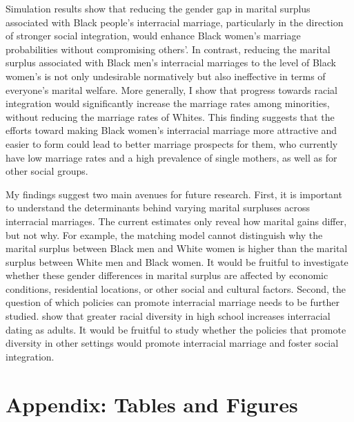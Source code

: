 Simulation results show that reducing the gender gap in marital surplus associated with Black people's interracial marriage, particularly in the direction of stronger social integration, would enhance Black women's marriage probabilities without compromising others'. In contrast, reducing the marital surplus associated with Black men's interracial marriages to the level of Black women's is not only undesirable normatively but also ineffective in terms of everyone's marital welfare. More generally, I show that progress towards racial integration would significantly increase the marriage rates among minorities, without reducing the marriage rates of Whites. This finding suggests that the efforts toward making Black women's interracial marriage more attractive and easier to form could lead to better marriage prospects for them, who currently have low marriage rates and a high prevalence of single mothers, as well as for other social groups.

My findings suggest two main avenues for future research. First, it is important to understand the determinants behind varying marital surpluses across interracial marriages. The current estimates only reveal how marital gains differ, but not why. For example, the matching model cannot distinguish why the marital surplus between Black men and White women is higher than the marital surplus between White men and Black women. It would be fruitful to investigate whether these gender differences in marital surplus are affected by economic conditions, residential locations, or other social and cultural factors. Second, the question of which policies can promote interracial marriage needs to be further studied. \cite{Merlinoetal_2019_SchoolPeers} show that greater racial diversity in high school increases interracial dating as adults. It would be fruitful to study whether the policies that promote diversity in other settings would promote interracial marriage and foster social integration.
\pagebreak





\pagebreak
\appendix


\setcounter{table}{0}
\renewcommand{\thetable}{A\arabic{table}}
\setcounter{figure}{0}
\renewcommand{\thefigure}{A\arabic{figure}}

\section{Appendix: Tables and Figures}


